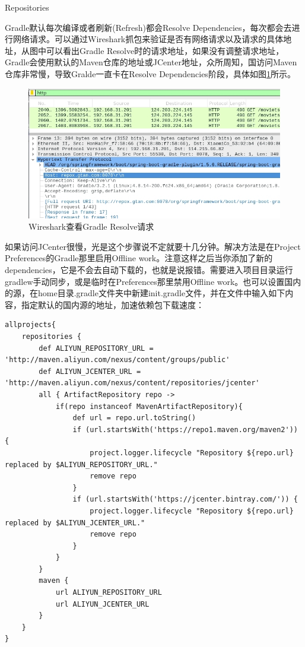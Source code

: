 \documentclass[12pt]{book}
\makeatletter
\numberwithin{dummy}{section}
\theoremstyle{ocrenumbox}
\theoremstyle{blacknumex}
\theoremstyle{blacknumbox}
\theoremstyle{ocrenum}
\renewcommand{\subsection}{\@startsection {subsection}{2}{\z@}
	{-3ex \@plus -0.1ex \@minus -.4ex}
	{0.5ex \@plus.2ex }
	{\normalfont\sffamily\bfseries}}
\makeatother
\begin{document}
\subsection{Repositories}

Gradle默认每次编译或者刷新(Refresh)都会Resolve Dependencies，每次都会去进行网络请求。可以通过Wireshark抓包来验证是否有网络请求以及请求的具体地址，从图中可以看出Gradle Resolve时的请求地址，如果没有调整请求地址，Gradle会使用默认的Maven仓库的地址或JCenter地址，众所周知，国访问Maven仓库非常慢，导致Gralde一直卡在Resolve Dependencies阶段，具体如图\ref{fig:wiresharkcapturegradlerequest}所示。

\begin{figure}[htbp]
	\centering
	\includegraphics[scale=0.5]{wiresharkcapturegradlerequest.jpg}
	\caption{Wireshark查看Gradle Resolve请求}
	\label{fig:wiresharkcapturegradlerequest}
\end{figure}


如果访问JCenter很慢，光是这个步骤说不定就要十几分钟。解决方法是在Project Preferences的Gradle那里启用Offline work。注意这样之后当你添加了新的dependencies，它是不会去自动下载的，也就是说报错。需要进入项目目录运行gradlew手动同步，或是临时在Preferences那里禁用Offline work。也可以设置国内的源，在home目录.gradle文件夹中新建init.gradle文件，并在文件中输入如下内容，指定默认的国内源的地址，加速依赖包下载速度：

\begin{lstlisting}
allprojects{
	repositories {
		def ALIYUN_REPOSITORY_URL = 'http://maven.aliyun.com/nexus/content/groups/public'
		def ALIYUN_JCENTER_URL = 'http://maven.aliyun.com/nexus/content/repositories/jcenter'
		all { ArtifactRepository repo ->
			if(repo instanceof MavenArtifactRepository){
				def url = repo.url.toString()
				if (url.startsWith('https://repo1.maven.org/maven2')) {
					project.logger.lifecycle "Repository ${repo.url} replaced by $ALIYUN_REPOSITORY_URL."
					remove repo
				}
				if (url.startsWith('https://jcenter.bintray.com/')) {
					project.logger.lifecycle "Repository ${repo.url} replaced by $ALIYUN_JCENTER_URL."
					remove repo
				}
			}
		}
		maven {
			url ALIYUN_REPOSITORY_URL
			url ALIYUN_JCENTER_URL
		}
	}
}
\end{lstlisting}
\end{document}
